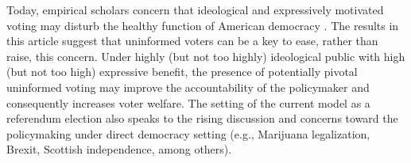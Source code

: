 \documentclass[letterpaper, 12pt]{article}
\begin{document}
    \par Today, empirical scholars concern that ideological and expressively motivated voting may disturb the healthy function of American democracy \citep{Iyengar2015fean, Achen2016defo}. The results in this article suggest that uninformed voters can be a key to ease, rather than raise, this concern. Under highly (but not too highly) ideological public with high (but not too high) expressive benefit, the presence of potentially pivotal uninformed voting may improve the accountability of the policymaker and consequently increases voter welfare. The setting of the current model as a referendum election also speaks to the rising discussion and concerns toward the policymaking under direct democracy setting (e.g., Marijuana legalization, Brexit, Scottish independence, among others).
    
    
\end{document}

